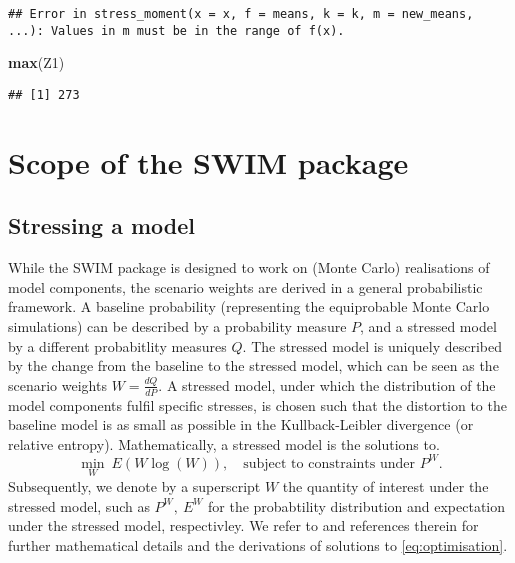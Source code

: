 \documentclass[]{article}
\newenvironment{Shaded}{\begin{snugshade}}{\end{snugshade}}
\newcommand{\KeywordTok}[1]{\textcolor[rgb]{0.13,0.29,0.53}{\textbf{#1}}}
\newcommand{\NormalTok}[1]{#1}
\begin{document}
\begin{verbatim}
## Error in stress_moment(x = x, f = means, k = k, m = new_means, ...): Values in m must be in the range of f(x).
\end{verbatim}

\begin{Shaded}
\begin{Highlighting}[]
\KeywordTok{max}\NormalTok{(Z1)}
\end{Highlighting}
\end{Shaded}

\begin{verbatim}
## [1] 273
\end{verbatim}

\hypertarget{Sec:Scope}{%
\section{Scope of the SWIM package}\label{Sec:Scope}}

\hypertarget{Rfunctions}{%
\subsection{Stressing a model}\label{Rfunctions}}

While the SWIM package is designed to work on (Monte Carlo) realisations of model components, the scenario weights are derived in a general probabilistic framework. A baseline probability (representing the equiprobable Monte Carlo simulations) can be described by a probability measure \(P\), and a stressed model by a different probabitlity measures \(Q\). The stressed model is uniquely described by the change from the baseline to the stressed model, which can be seen as the scenario weights \(W= \frac{dQ}{dP}\). A stressed model, under which the distribution of the model components fulfil specific stresses, is chosen such that the distortion to the baseline model is as small as possible in the Kullback-Leibler divergence (or relative entropy). Mathematically, a stressed model is the solutions to.
\begin{equation} 
\min_{ W } ~E(W \log (W)), \quad
\text{subject to constraints under } P^W.
\label{eq:optimisation}
\end{equation}
Subsequently, we denote by a superscript \(W\) the quantity of interest under the stressed model, such as \(P^W, ~ E^W\) for the probabtility distribution and expectation under the stressed model, respectivley. We refer to \citet{Pesenti2019} and references therein for further mathematical details and the derivations of solutions to \eqref{eq:optimisation}.
\end{document}
